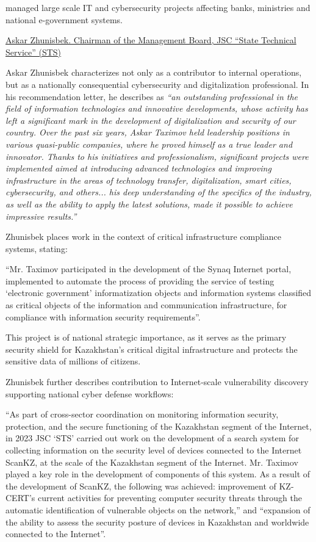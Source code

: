 \label{subsubsecContribCyberInfrastructure}

\mrl{} managed large scale IT and cybersecurity projects affecting banks, ministries and national e-government systems.

\bigskip
\noindent\underline{Askar Zhunisbek. Chairman of the Management Board, JSC ``State Technical Service'' (STS)}

Askar Zhunisbek characterizes \mrl{} not only as a contributor to internal operations, but as a nationally consequential cybersecurity and digitalization professional. In his recommendation letter, he describes \mrl{} as \emph{``an outstanding professional in the field of information technologies and innovative developments, whose activity has left a significant mark in the development of digitalization and security of our country. Over the past six years, Askar Taximov held leadership positions in various quasi-public companies, where he proved himself as a true leader and innovator. Thanks to his initiatives and professionalism, significant projects were implemented aimed at introducing advanced technologies and improving infrastructure in the areas of technology transfer, digitalization, smart cities, cybersecurity, and others... his deep understanding of the specifics of the industry, as well as the ability to apply the latest solutions, made it possible to achieve impressive results.''}

Zhunisbek places \mrls work in the context of critical infrastructure compliance systems, stating:
\begin{fullquote}
``Mr. Taximov participated in the development of the Synaq Internet portal, implemented to automate the process of providing the service of testing `electronic government' informatization objects and information systems classified as critical objects of the information and communication infrastructure, for compliance with information security requirements''.
\end{fullquote}
This project is of national strategic importance, as it serves as the primary security shield for Kazakhstan’s critical digital infrastructure and protects the sensitive data of millions of citizens.

Zhunisbek further describes \mrls contribution to Internet-scale vulnerability discovery supporting national cyber defense workflows:
\begin{fullquote}
``As part of cross-sector coordination on monitoring information security, protection, and the secure functioning of the Kazakhstan segment of the Internet, in 2023 JSC `STS' carried out work on the development of a search system for collecting information on the security level of devices connected to the Internet ScanKZ, at the scale of the Kazakhstan segment of the Internet. Mr. Taximov played a key role in the development of components of this system. As a result of the development of ScanKZ, the following was achieved: improvement of KZ-CERT’s current activities for preventing computer security threats through the automatic identification of vulnerable objects on the network,'' and ``expansion of the ability to assess the security posture of devices in Kazakhstan and worldwide connected to the Internet''.
\end{fullquote}

